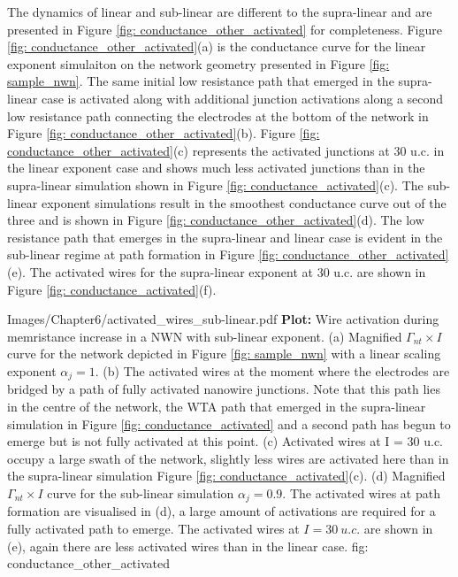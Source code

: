 The dynamics of linear and sub-linear are different to the supra-linear and are presented in Figure \ref{fig: conductance_other_activated} for completeness. Figure \ref{fig: conductance_other_activated}(a) is the conductance curve for the linear exponent simulaiton on the network geometry presented in Figure \ref{fig: sample_nwn}. The same initial low resistance path that emerged in the supra-linear case is activated along with additional junction activations along a second low resistance path connecting the electrodes at the bottom of the network in Figure \ref{fig: conductance_other_activated}(b). Figure \ref{fig: conductance_other_activated}(c) represents the activated junctions at 30 u.c. in the linear exponent case and shows much less activated junctions than in the supra-linear simulation shown in Figure \ref{fig: conductance_activated}(c). The sub-linear exponent simulations result in the smoothest conductance curve out of the three and is shown in Figure \ref{fig: conductance_other_activated}(d). The low resistance path that emerges in the supra-linear and linear case is evident in the sub-linear regime at path formation in Figure \ref{fig: conductance_other_activated}(e). The activated wires for the supra-linear exponent at 30 u.c. are shown in Figure \ref{fig: conductance_activated}(f).

{Images/Chapter6/activated_wires_sub-linear.pdf}
{\textbf{Plot:} Wire activation during memristance increase in a NWN with sub-linear exponent.}
{(a) Magnified $\Gamma_{nt} \times I$ curve for the network depicted in Figure \ref{fig: sample_nwn} with a linear scaling exponent $\alpha_j = 1$. (b) The activated wires at the moment where the electrodes are bridged by a path of fully activated nanowire junctions. Note that this path lies in the centre of the network, the WTA path that emerged in the supra-linear simulation in Figure \ref{fig: conductance_activated} and a second path has begun to emerge but is not fully activated at this point. (c) Activated wires at I = 30 u.c. occupy a large swath of the network, slightly less wires are activated here than in the supra-linear simulation Figure \ref{fig: conductance_activated}(c). (d) Magnified $\Gamma_{nt} \times I$ curve for the sub-linear simulation $\alpha_j = 0.9$. The activated wires at path formation are visualised in (d), a large amount of activations are required for a fully activated path to emerge. The activated wires at $I = 30~ u.c.$ are shown in (e), again there are less activated wires than in the linear case.  }
{fig: conductance_other_activated}

